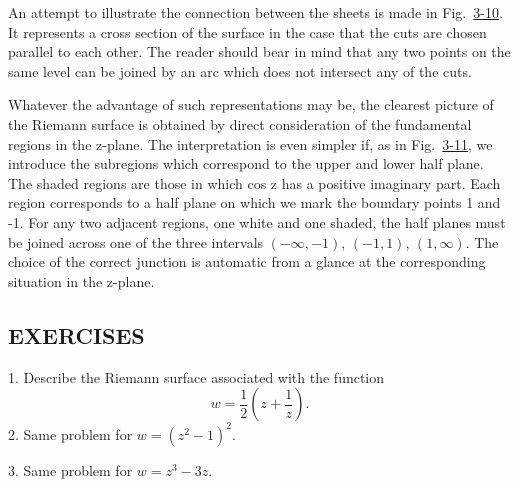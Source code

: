 An attempt to illustrate the connection between the sheets is made in Fig.~\hyperref[fig:3-10]{3-10}. It represents a cross section of the surface in the case that the cuts are chosen parallel to each other. The reader should bear in mind that any two points on the same level can be joined by an arc which does not intersect any of the cuts.

Whatever the advantage of such representations may be, the clearest picture of the Riemann surface is obtained by direct consideration of the fundamental regions in the z-plane. The interpretation is even simpler if, as in Fig.~\hyperref[fig:3-11]{3-11}, we introduce the subregions which correspond to the upper and lower half plane. The shaded regions are those in which cos z has a positive imaginary part. Each region corresponds to a half plane on which we mark the boundary points 1 and -1. For any two adjacent regions, one white and one shaded, the half planes must be joined across one of the three intervals $(-∞,-1)$, $(-1,1)$, $(1,∞)$. The choice of the correct junction is automatic from a glance at the corresponding situation in the z-plane.

\subsection*{EXERCISES}
1. Describe the Riemann surface associated with the function
\begin{equation*}
w = \frac {1}{2} \left(z + \frac {1}{z}\right).
\end{equation*}
2. Same problem for $w = (z^2 - 1)^2$.

3. Same problem for $w = z^3 - 3z$.


